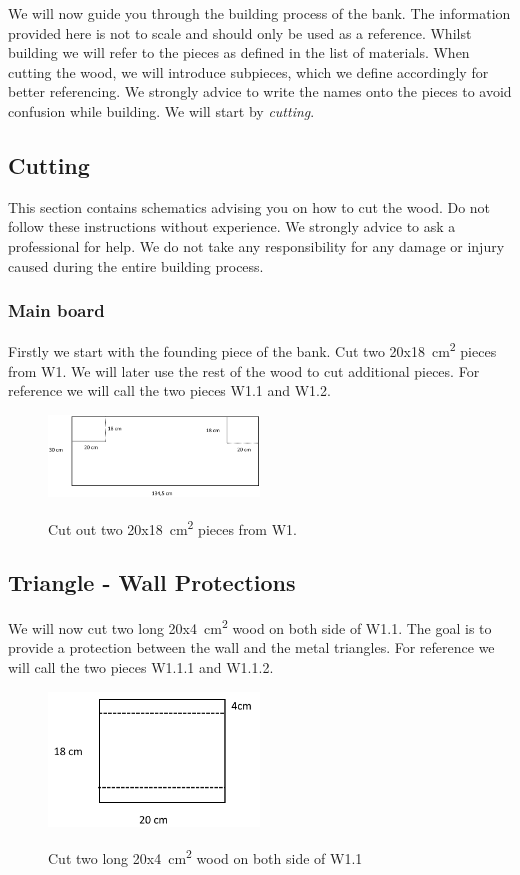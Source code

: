 \documentclass{subfiles}
\begin{document}
    We will now guide you through the building process of the bank. The information provided here is not to scale and should only be used as a reference. Whilst building we will refer to the pieces as defined in the list of materials. When cutting the wood, we will introduce subpieces, which we define accordingly for better referencing. We strongly advice to write the names onto the pieces to avoid confusion while building. We will start by \emph{cutting}.

    \subsection{Cutting}
        This section contains schematics advising you on how to cut the wood. Do not follow these instructions without experience. We strongly advice to ask a professional for help. We do not take any responsibility for any damage or injury caused during the entire building process.

    \subsubsection*{Main board}
    Firstly we start with the founding piece of the bank. Cut two 20x18\SI{}{\square\centi\meter} pieces from W1.
    We will later use the rest of the wood to cut additional pieces. For reference we will call the two pieces W1.1 and W1.2.
    \begin{figure}[h]
        \centering
        \includegraphics[width=0.5\textwidth]{Ressources/Cut_W1.png}
        \label{fig:Cut_W1}
        \caption{Cut out two 20x18\SI{}{\square\centi\meter} pieces from W1. }
    \end{figure}


    \subsection*{Triangle - Wall Protections}
    We will now cut two long 20x4\SI{}{\square\centi\meter} wood on both side of W1.1. The goal is to 
    provide a protection between the wall and the metal triangles. For reference we will call the two pieces W1.1.1 and W1.1.2.
    \begin{figure}[h]
        \centering
        \includegraphics[width=0.5\textwidth]{Ressources/Cut_W1_1.png}
        \label{fig:Cut_W1_1}
        \caption{Cut two long 20x4\SI{}{\square\centi\meter} wood on both side of W1.1}
    \end{figure}
\end{document}
